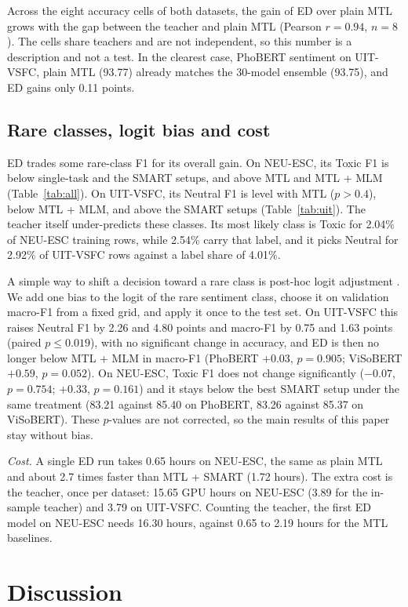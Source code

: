 \documentclass[pdflatex,sn-mathphys-num]{sn-jnl}%
\theoremstyle{thmstyleone}%
\theoremstyle{thmstyletwo}%
\theoremstyle{thmstylethree}%
\begin{document}
Across the eight accuracy cells of both datasets, the gain of ED over plain MTL grows with the gap between the teacher and plain MTL (Pearson $r=0.94$, $n=8$). The cells share teachers and are not independent, so this number is a description and not a test. In the clearest case, PhoBERT sentiment on UIT-VSFC, plain MTL (93.77) already matches the 30-model ensemble (93.75), and ED gains only 0.11 points.

\subsection{Rare classes, logit bias and cost}\label{subsec:rare}

ED trades some rare-class F1 for its overall gain. On NEU-ESC, its Toxic F1 is below single-task and the SMART setups, and above MTL and MTL + MLM (Table~\ref{tab:all}). On UIT-VSFC, its Neutral F1 is level with MTL ($p>0.4$), below MTL + MLM, and above the SMART setups (Table~\ref{tab:uit}). The teacher itself under-predicts these classes. Its most likely class is Toxic for 2.04\% of NEU-ESC training rows, while 2.54\% carry that label, and it picks Neutral for 2.92\% of UIT-VSFC rows against a label share of 4.01\%.

A simple way to shift a decision toward a rare class is post-hoc logit adjustment \cite{menon2021logit}. We add one bias to the logit of the rare sentiment class, choose it on validation macro-F1 from a fixed grid, and apply it once to the test set. On UIT-VSFC this raises Neutral F1 by 2.26 and 4.80 points and macro-F1 by 0.75 and 1.63 points (paired $p\le0.019$), with no significant change in accuracy, and ED is then no longer below MTL + MLM in macro-F1 (PhoBERT $+0.03$, $p=0.905$; ViSoBERT $+0.59$, $p=0.052$). On NEU-ESC, Toxic F1 does not change significantly ($-0.07$, $p=0.754$; $+0.33$, $p=0.161$) and it stays below the best SMART setup under the same treatment (83.21 against 85.40 on PhoBERT, 83.26 against 85.37 on ViSoBERT). These $p$-values are not corrected, so the main results of this paper stay without bias.

\textit{Cost.} A single ED run takes 0.65 hours on NEU-ESC, the same as plain MTL and about 2.7 times faster than MTL + SMART (1.72 hours). The extra cost is the teacher, once per dataset: 15.65 GPU hours on NEU-ESC (3.89 for the in-sample teacher) and 3.79 on UIT-VSFC. Counting the teacher, the first ED model on NEU-ESC needs 16.30 hours, against 0.65 to 2.19 hours for the MTL baselines.

\section{Discussion}\label{sec:discussion}
\end{document}
